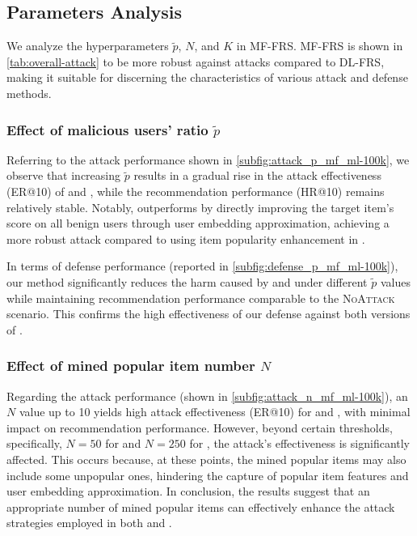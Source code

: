 \subsection{Parameters Analysis}
\label{exp:parameters_analysis}
We analyze the hyperparameters $\tilde{p}$, $N$, and $K$ in MF-FRS. MF-FRS is shown in \cref{tab:overall-attack} to be more robust against attacks compared to DL-FRS, making it suitable for discerning the characteristics of various attack and defense methods.


\subsubsection{Effect of malicious users' ratio \texorpdfstring{$\tilde{p}$}{Lg}}
Referring to the attack performance shown in \cref{subfig:attack_p_mf_ml-100k}, we observe that increasing $\tilde{p}$ results in a gradual rise in the attack effectiveness (ER@10) of \modelI{} and \modelII{}, while the recommendation performance (HR@10) remains relatively stable. Notably, \modelII{} outperforms \modelI{} by directly improving the target item's score on all benign users through user embedding approximation, achieving a more robust attack compared to using item popularity enhancement in \modelI{}.
 
In terms of defense performance (reported in \cref{subfig:defense_p_mf_ml-100k}), our method significantly reduces the harm caused by \modelI{} and \modelII{} under different $\tilde{p}$ values while maintaining recommendation performance comparable to the \textsc{NoAttack} scenario. This confirms the high effectiveness of our defense against both versions of \model{}.

\subsubsection{Effect of mined popular item number \texorpdfstring{$N$}{Lg}}
Regarding the attack performance (shown in \cref{subfig:attack_n_mf_ml-100k}), an $N$ value up to 10 yields high attack effectiveness (ER@10) for \modelI{} and \modelII{}, with minimal impact on recommendation performance. However, beyond certain thresholds, specifically, $N=50$ for \modelI{} and $N=250$ for \modelII{}, the attack's effectiveness is significantly affected. This occurs because, at these points, the mined popular items may also include some unpopular ones, hindering the capture of popular item features and user embedding approximation. In conclusion, the results suggest that an appropriate number of mined popular items can effectively enhance the attack strategies employed in both \modelI{} and \modelII{}.

